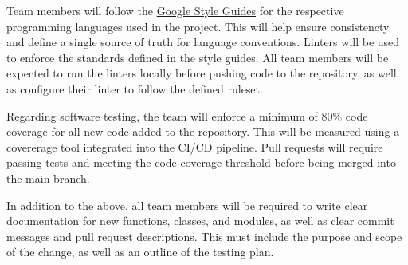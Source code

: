 \documentclass{article}
\begin{document}





Team members will follow the \href{https://github.com/google/styleguide}{Google Style Guides} for the respective programming languages used in the project. This will help ensure consistencty and define a single source of truth for language conventions. 
Linters will be used to enforce the standards defined in the style guides. All team members will be expected to run the linters locally before pushing code to the repository, as well as configure their linter to follow the defined ruleset. 

Regarding software testing, the team will enforce a minimum of 80\% code coverage for all new code added to the repository. This will be measured using a covererage tool integrated into the CI/CD pipeline. Pull requests will require passing tests and meeting the code coverage threshold before being merged into the main branch.

In addition to the above, all team members will be required to write clear documentation for new functions, classes, and modules, as well as clear commit messages and pull request descriptions. This must include the purpose and scope of the change, as well as an outline of the testing plan. 
\end{document}
